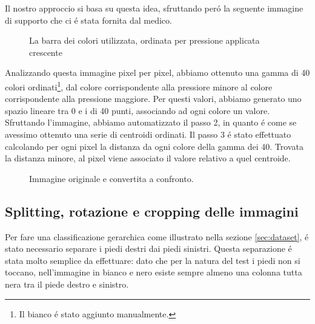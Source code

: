 \documentclass[11pt,twoside,a4paper]{article}
\begin{document}
Il nostro approccio si basa su questa idea, sfruttando per\'o la seguente immagine di supporto che ci \'e stata fornita dal medico.
\begin{figure}
\centering
\caption{La barra dei colori utilizzata, ordinata per pressione applicata crescente}
\end{figure}
Analizzando questa immagine pixel per pixel, abbiamo ottenuto una gamma di 40 colori ordinati\footnote{Il bianco \'e stato aggiunto manualmente.}, dal colore corrispondente alla pressiore minore al colore corrispondente alla pressione maggiore. Per questi valori, abbiamo generato uno spazio lineare tra 0 e i di 40 punti, associando ad ogni colore un valore. Sfruttando l'immagine, abbiamo automatizzato il passo 2, in quanto \'e come se avessimo ottenuto una serie di centroidi ordinati. Il passo 3 \'e stato effettuato calcolando per ogni pixel la distanza da ogni colore della gamma dei 40. Trovata la distanza minore, al pixel viene associato il valore relativo a quel centroide.

\begin{figure}
\centering
\begin{subfigure}{.4\textwidth}
\end{subfigure}
\begin{subfigure}{.4\textwidth}
\end{subfigure}
\caption{Immagine originale e convertita a confronto.}
\end{figure}

%
%

\subsection{Splitting, rotazione e cropping delle immagini}
\label{subsec:splitting}
Per fare una classificazione gerarchica come illustrato nella sezione \ref{sec:dataset}, \'e stato necessario separare i piedi destri dai piedi sinistri. Questa separazione \'e stata molto semplice da effettuare: dato che per la natura del test i piedi non si toccano, nell'immagine in bianco e nero esiste sempre almeno una colonna tutta nera tra il piede destro e sinistro. 
\end{document}
